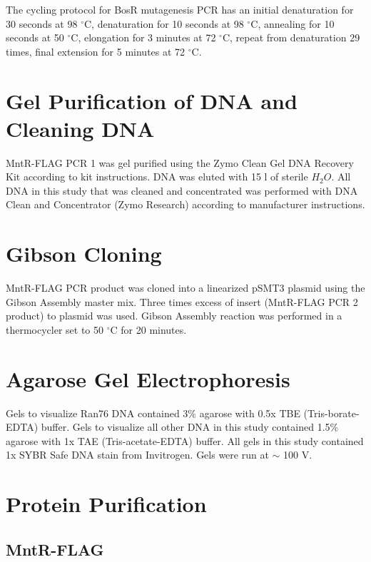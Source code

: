 \documentclass[12pt,twoside]{reedthesis}
\begin{document}
The cycling protocol for BosR mutagenesis PCR has an initial denaturation for 30 seconds at 98 $^{\circ}$C, denaturation for 10 seconds at 98 $^{\circ}$C, annealing for 10 seconds at 50 $^{\circ}$C, elongation for 3 minutes at 72 $^{\circ}$C, repeat from denaturation 29 times, final extension for 5 minutes at 72 $^{\circ}$C. 


\section{Gel Purification of DNA and Cleaning DNA}

MntR-FLAG PCR 1 was gel purified using the Zymo Clean Gel DNA Recovery Kit according to kit instructions. DNA was eluted with 15 \micro l of sterile $H_{2}O$. All DNA in this study that was cleaned and concentrated was performed with DNA Clean and Concentrator (Zymo Research) according to manufacturer instructions.  

\section{Gibson Cloning}
MntR-FLAG PCR product was cloned into a linearized pSMT3 plasmid using the Gibson Assembly master mix. Three times excess of insert (MntR-FLAG PCR 2 product) to plasmid was used. Gibson Assembly reaction was performed in a thermocycler set to 50 $^\circ$C for 20 minutes. 


 
\section{Agarose Gel Electrophoresis}

Gels to visualize Ran76 DNA contained 3\% agarose with 0.5x TBE (Tris-borate-EDTA) buffer. Gels to visualize all other DNA in this study contained 1.5\% agarose with 1x TAE (Tris-acetate-EDTA) buffer. All gels in this study contained 1x SYBR Safe DNA stain from Invitrogen. Gels were run at $\sim$ 100 V. 

\section{Protein Purification}

\subsection{MntR-FLAG}
\end{document}

